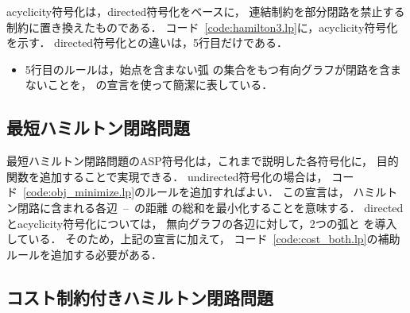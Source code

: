 \textsf{acyclicity}符号化は，\textsf{directed}符号化をベースに，
連結制約を部分閉路を禁止する制約に置き換えたものである．
コード~\ref{code:hamilton3.lp}に，\textsf{acyclicity}符号化を示す．
\textsf{directed}符号化との違いは，5行目だけである．
\begin{itemize}
\item 5行目のルールは，始点を含まない弧
  の集合をもつ有向グラフが閉路を含まないことを，
  {\clingo}の宣言を使って簡潔に表している．
\end{itemize}

\subsection{最短ハミルトン閉路問題}\label{minexpl}





最短ハミルトン閉路問題のASP符号化は，これまで説明した各符号化に，
目的関数を追加することで実現できる．
\textsf{undirected}符号化の場合は，
コード~\ref{code:obj_minimize.lp}のルールを追加すればよい．
%
この宣言は，
ハミルトン閉路に含まれる各辺~--~の距離
の総和を最小化することを意味する．
%
\textsf{directed}と\textsf{acyclicity}符号化については，
無向グラフの各辺に対して，2つの弧と
を導入している．
そのため，上記の宣言に加えて，
コード~\ref{code:cost_both.lp}の補助ルールを追加する必要がある．

\subsection{コスト制約付きハミルトン閉路問題}

